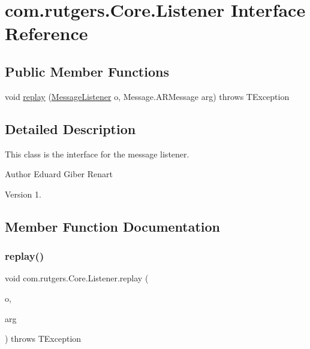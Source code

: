 \hypertarget{interfacecom_1_1rutgers_1_1Core_1_1Listener}{}\section{com.\+rutgers.\+Core.\+Listener Interface Reference}
\label{interfacecom_1_1rutgers_1_1Core_1_1Listener}
\subsection*{Public Member Functions}
\begin{DoxyCompactItemize}
\item 
void \hyperlink{interfacecom_1_1rutgers_1_1Core_1_1Listener_a55c7d023e5fcfe48e12986a476410fe7}{replay} (\hyperlink{classcom_1_1rutgers_1_1Core_1_1MessageListener}{Message\+Listener} o, Message.\+A\+R\+Message arg)  throws T\+Exception
\end{DoxyCompactItemize}


\subsection{Detailed Description}
This class is the interface for the message listener.

\begin{DoxyAuthor}{Author}
Eduard Giber Renart 
\end{DoxyAuthor}
\begin{DoxyVersion}{Version}
1. 
\end{DoxyVersion}


\subsection{Member Function Documentation}
\mbox{\label{interfacecom_1_1rutgers_1_1Core_1_1Listener_a55c7d023e5fcfe48e12986a476410fe7}} 
\subsubsection{\texorpdfstring{replay()}{replay()}}
{\footnotesize\ttfamily void com.\+rutgers.\+Core.\+Listener.\+replay (\begin{DoxyParamCaption}\item[{\hyperlink{classcom_1_1rutgers_1_1Core_1_1MessageListener}{Message\+Listener}}]{o,  }\item[{Message.\+A\+R\+Message}]{arg }\end{DoxyParamCaption}) throws T\+Exception}

